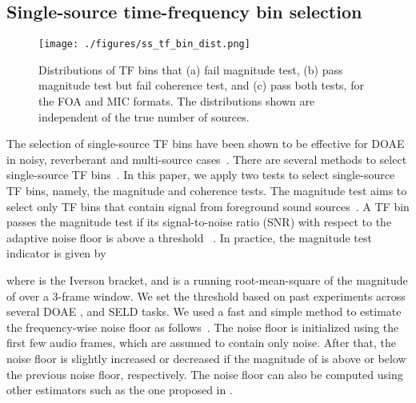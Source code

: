 \documentclass[journal]{IEEEtran}
\begin{document}
\subsection{Single-source time-frequency bin selection}
\label{subsec:ss_tf_selection}

\begin{figure}[tb]
    \centering
    \texttt{[image: ./figures/ss\_tf\_bin\_dist.png]}
    \vspace{-0.3cm}
    \caption{Distributions of TF bins that {(a)} fail magnitude test, {(b)} pass magnitude test but fail coherence test, and {(c)} pass both tests, for the FOA and MIC formats. The distributions shown are independent of the true number of sources.}
    \label{fig:tf_bin_dist}
\end{figure} 

The selection of single-source TF bins have been shown to be effective for DOAE in noisy, reverberant and multi-source cases~\cite{Nguyen2014RobustSources, Nguyen2020ADetection, Nguyen2020RobustNetwork}. There are several methods to select single-source TF bins~\cite{Mohan2008LocalizationTest, Pavlidi2013Real-TimeArray, Nguyen2014RobustSources}. In this paper, we apply two tests to select single-source TF bins, namely, the magnitude and coherence tests. The magnitude test aims to select only TF bins that contain signal from foreground sound sources~\cite{Nguyen2014RobustSources}. A TF bin passes the magnitude test if its signal-to-noise ratio (SNR) with respect to the adaptive noise floor  is above a threshold ~\cite{Nguyen2014RobustSources}. In practice, the magnitude test indicator is given by

where  is the Iverson bracket, and  is a running root-mean-square of the magnitude of  over a 3-frame window. We set the threshold  based on past experiments across several DOAE \cite{Nguyen2014RobustSources, Nguyen2020RobustNetwork, Zhao2015RobustReduction}, and SELD \cite{Nguyen2020ADetection, Nguyen2020EnsembleTracking, Nguyen2019DCASEDetection} tasks. We used a fast and simple method to estimate the frequency-wise noise floor  as follows~\cite{Nguyen2014RobustSources}. The noise floor is initialized using the first few audio frames, which are assumed to contain only noise. After that, the noise floor is slightly increased or decreased if the magnitude of  is above or below the previous noise floor, respectively. The noise floor can also be computed using other estimators such as the one proposed in \cite{Gerkmann2012UnbiasedDelay}.
\end{document}

